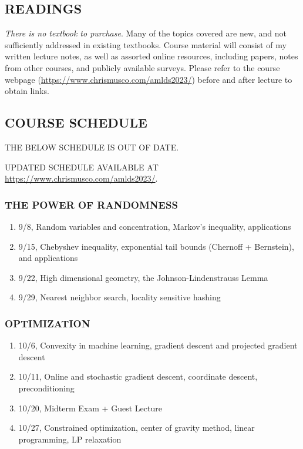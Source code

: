 \documentclass[10pt]{article}
\begin{document}
\subsection{READINGS}
\textit{There is no textbook to purchase}. Many of the topics covered are new, and not sufficiently addressed in existing textbooks. Course material will consist of my written lecture notes, as well as assorted online resources, including papers, notes from other courses, and publicly available surveys. Please refer to the course webpage (\url{https://www.chrismusco.com/amlds2023/}) before and after lecture to obtain links.


\subsection{COURSE SCHEDULE}
\begin{center}
THE BELOW SCHEDULE IS OUT OF DATE. 

UPDATED SCHEDULE AVAILABLE AT \href{https://www.chrismusco.com/amlds2023/}{https://www.chrismusco.com/amlds2023/}.
\end{center}
\subsubsection{THE POWER OF RANDOMNESS}
\begin{enumerate}\itemsep0em 
	\item 9/8, Random variables and concentration, Markov's inequality,  applications
	\item 9/15, Chebyshev inequality, exponential tail bounds (Chernoff + Bernstein), and applications
	\item 9/22, High dimensional geometry, the Johnson-Lindenstrauss Lemma
	\item 9/29,	Nearest neighbor search, locality sensitive hashing
\end{enumerate}

\subsubsection{OPTIMIZATION}
\begin{enumerate}\itemsep0em 
	\setcounter{enumi}{4}	
	\item 10/6,	Convexity in machine learning, gradient descent and projected gradient descent
	\hspace{.5em}
	\item 10/11, Online and stochastic gradient descent, coordinate descent, preconditioning
	\item 10/20, Midterm Exam + Guest Lecture
	\item 10/27, Constrained optimization, center of gravity method, linear programming, LP relaxation
\end{enumerate}
\end{document}
